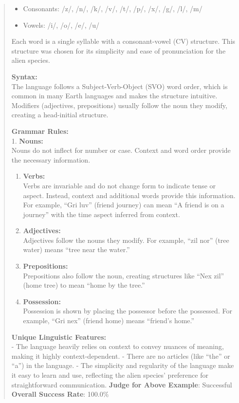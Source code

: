 \documentclass[fleqn,10pt]{wlscirep}
\providecommand{\tightlist}{%
  \setlength{\itemsep}{0pt}\setlength{\parskip}{0pt}}
\begin{document}
\begin{quote}
\begin{itemize}
\tightlist
\item
  Consonants: /z/, /n/, /k/, /v/, /t/, /p/, /x/, /g/, /l/, /m/\\
\item
  Vowels: /i/, /o/, /e/, /u/
\end{itemize}

Each word is a single syllable with a consonant-vowel (CV) structure.
This structure was chosen for its simplicity and ease of pronunciation
for the alien species.

\textbf{Syntax:}\\
The language follows a Subject-Verb-Object (SVO) word order, which is
common in many Earth languages and makes the structure intuitive.
Modifiers (adjectives, prepositions) usually follow the noun they
modify, creating a head-initial structure.

\textbf{Grammar Rules:}\\
1. \textbf{Nouns:}\\
Nouns do not inflect for number or case. Context and word order provide
the necessary information.

\begin{enumerate}
\def\labelenumi{\arabic{enumi}.}
\setcounter{enumi}{1}
\item
  \textbf{Verbs:}\\
  Verbs are invariable and do not change form to indicate tense or
  aspect. Instead, context and additional words provide this
  information. For example, ``Gri luv'' (friend journey) can mean ``A
  friend is on a journey'' with the time aspect inferred from context.
\item
  \textbf{Adjectives:}\\
  Adjectives follow the nouns they modify. For example, ``zil nor''
  (tree water) means ``tree near the water.''
\item
  \textbf{Prepositions:}\\
  Prepositions also follow the noun, creating structures like ``Nex
  zil'' (home tree) to mean ``home by the tree.''
\item
  \textbf{Possession:}\\
  Possession is shown by placing the possessor before the possessed. For
  example, ``Gri nex'' (friend home) means ``friend's home.''
\end{enumerate}

\textbf{Unique Linguistic Features:}\\
- The language heavily relies on context to convey nuances of meaning,
making it highly context-dependent. - There are no articles (like
``the'' or ``a'') in the language. - The simplicity and regularity of
the language make it easy to learn and use, reflecting the alien
species' preference for straightforward communication. \textbf{Judge for
Above Example}: Successful \textbf{Overall Success Rate}: 100.0\%
\end{quote}
\end{document}
